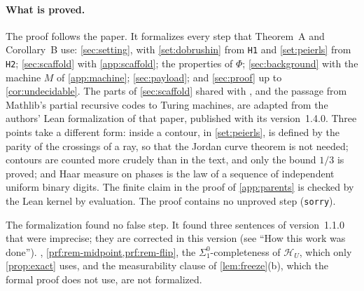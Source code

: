 \paragraph{What is proved.} The proof follows the paper. It formalizes every step that Theorem~A and Corollary~B use: \cref{sec:setting}, with \cref{set:dobrushin} from \texttt{H1} and \cref{set:peierls} from \texttt{H2}; \cref{sec:scaffold} with \cref{app:scaffold}; the properties of $\Phi$; \cref{sec:background} with the machine $M$ of \cref{app:machine}; \cref{sec:payload}; and \cref{sec:proof} up to \cref{cor:undecidable}. The parts of \cref{sec:scaffold} shared with \cite{DM26forget}, and the passage from Mathlib's partial recursive codes to Turing machines, are adapted from the authors' Lean formalization of that paper, published with its version~1.4.0. Three points take a different form: inside a contour, in \cref{set:peierls}, is defined by the parity of the crossings of a ray, so that the Jordan curve theorem is not needed; contours are counted more crudely than in the text, and only the bound $1/3$ is proved; and Haar measure on phases is the law of a sequence of independent uniform binary digits. The finite claim in the proof of \cref{app:parents} is checked by the Lean kernel by evaluation. The proof contains no unproved step (\texttt{sorry}).

The formalization found no false step. It found three sentences of version~1.1.0 that were imprecise; they are corrected in this version (see ``How this work was done''). , \cref{prf:rem-midpoint,prf:rem-flip}, the $\Sigma^0_1$-completeness of $\mathcal H_U$, which only \cref{prop:exact} uses, and the measurability clause of \cref{lem:freeze}(b), which the formal proof does not use, are not formalized.

